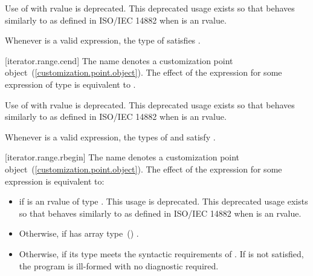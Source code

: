 {\pnum
Use of  with rvalue  is deprecated.
\enternote This deprecated usage exists so that 
behaves similarly to  as defined in ISO/IEC 14882 when
 is an rvalue. \exitnote

\pnum
\enternote Whenever  is a valid expression, the
type of  satisfies . \exitnote

[iterator.range.cend]{}
\pnum
The name  denotes a customization point
object~(\ref{customization.point.object}). The effect of the expression
 for some expression  of type 
is equivalent to .

\pnum
Use of  with rvalue  is deprecated.
\enternote This deprecated usage exists so that 
behaves similarly to  as defined in ISO/IEC 14882 when
 is an rvalue. \exitnote

\pnum
\enternote Whenever  is a valid expression, the
types of  and  satisfy
. \exitnote

[iterator.range.rbegin]{}
\pnum
The name  denotes a customization point
object~(\ref{customization.point.object}). The effect of the expression
 for some expression  is equivalent
to:

\begin{itemize}
\item
   if  is an rvalue of
  type . This usage is deprecated.
  \enternote This deprecated usage exists so that
   behaves similarly to 
  as defined in ISO/IEC 14882 when  is an rvalue. \exitnote

\item
  Otherwise,  if
   has array type~() .

\item
  Otherwise,  if its type  meets the
  syntactic requirements of . If 
  is not satisfied, the program is ill-formed with no diagnostic
  required.


\end{itemize}}
